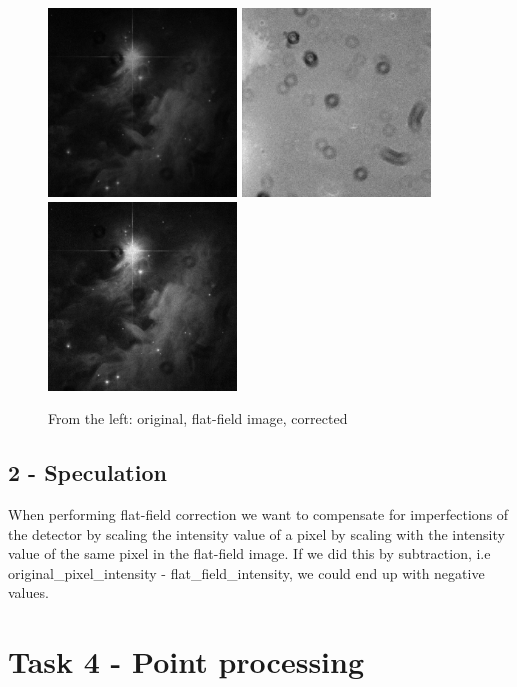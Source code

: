 \begin{figure}[h!]
    \centering
    \includegraphics[width=5cm]{../LAB1/img/disturbed_potw1144a.png}
    \includegraphics[width=5cm]{../LAB1/img/flatfieldimage.png}
    \includegraphics[width=5cm]{../LAB1/output/disturbed_potw1144a.png}
    \caption{From the left: original, flat-field image, corrected}
\end{figure}

\subsection*{2 - Speculation}

When performing flat-field correction we want to compensate for imperfections of the detector by scaling the intensity value of a pixel by scaling with the intensity value of the same pixel in the flat-field image.
If we did this by subtraction, i.e original\_pixel\_intensity - flat\_field\_intensity, we could end up with negative values.


\section*{Task 4 - Point processing}


